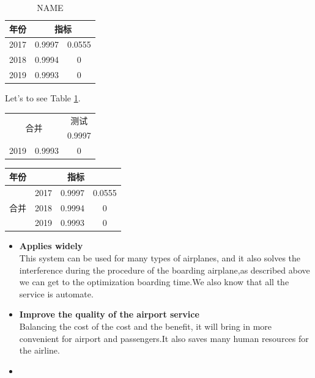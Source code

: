 \documentclass{mcmthesis}
\begin{document}
\begin{table}[h]
  \centering
  \begin{tabular}{c|cc}
\hline
年份 & \multicolumn{2}{c}{指标}\\
\hline
2017 & 0.9997 & 0.0555 \\
2018 & 0.9994 & 0      \\
2019 & 0.9993 & 0      \\
\hline
\end{tabular}
  \caption{NAME}\label{SIGN}
\end{table}

Let's to see Table \ref{SIGN}.


\begin{minipage}{0.5\linewidth}
\begin{tabular}{|c|c|c|}
\hline
\multicolumn{2}{|c|}{\multirow{2}{*}{合并}}&测试\\
\cline{3-3}
\multicolumn{2}{|c|}{}& 0.9997  \\
\hline
2019 & 0.9993 & 0 \\
\hline
\end{tabular}
\end{minipage}
\begin{minipage}{0.5\linewidth}
\begin{tabular}{c|ccc}
\hline
年份 & \multicolumn{3}{c}{指标}\\
\hline
\multirow{3}{*}{合并}&2017 & 0.9997 & 0.0555 \\
&2018 & 0.9994 & 0      \\
&2019 & 0.9993 & 0      \\
\hline
\end{tabular}
\end{minipage}






\begin{itemize}
\item \textbf{Applies widely}\\
This  system can be used for many types of airplanes, and it also
solves the interference during  the procedure of the boarding
airplane,as described above we can get to the  optimization
boarding time.We also know that all the service is automate.
\item \textbf{Improve the quality of the airport service}\\
Balancing the cost of the cost and the benefit, it will bring in
more convenient  for airport and passengers.It also saves many
human resources for the airline. \item \textbf{}
\end{itemize}
\end{document}

